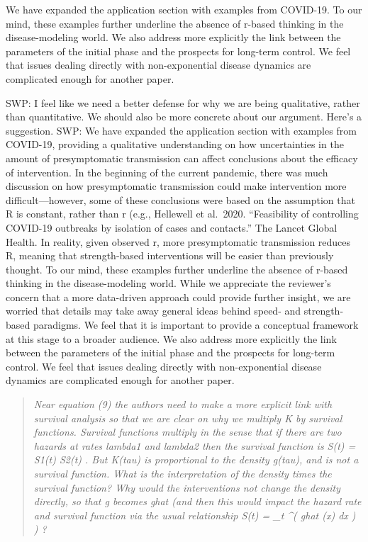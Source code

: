 We have expanded the application section with examples from COVID-19. To
our mind, these examples further underline the absence of r-based
thinking in the disease-modeling world. We also address more explicitly
the link between the parameters of the initial phase and the prospects
for long-term control. We feel that issues dealing directly with
non-exponential disease dynamics are complicated enough for another
paper.

SWP: I feel like we need a better defense for why we are being
qualitative, rather than quantitative. We should also be more concrete
about our argument. Here's a suggestion. SWP: We have expanded the
application section with examples from COVID-19, providing a qualitative
understanding on how uncertainties in the amount of presymptomatic
transmission can affect conclusions about the efficacy of intervention.
In the beginning of the current pandemic, there was much discussion on
how presymptomatic transmission could make intervention more
difficult---however, some of these conclusions were based on the
assumption that R is constant, rather than r (e.g., Hellewell et
al.~2020. ``Feasibility of controlling COVID-19 outbreaks by isolation
of cases and contacts.'' The Lancet Global Health. In reality, given
observed r, more presymptomatic transmission reduces R, meaning that
strength-based interventions will be easier than previously thought. To
our mind, these examples further underline the absence of r-based
thinking in the disease-modeling world. While we appreciate the
reviewer's concern that a more data-driven approach could provide
further insight, we are worried that details may take away general ideas
behind speed- and strength-based paradigms. We feel that it is important
to provide a conceptual framework at this stage to a broader audience.
We also address more explicitly the link between the parameters of the
initial phase and the prospects for long-term control. We feel that
issues dealing directly with non-exponential disease dynamics are
complicated enough for another paper.

\begin{quote}\sl
Near equation (9) the authors need to make a more explicit link with
survival analysis so that we are clear on why we multiply K by survival
functions. Survival functions multiply in the sense that if there are
two hazards at rates lambda1 and lambda2 then the survival function is
S(t) = S1(t) S2(t) . But K(tau) is proportional to the density g(tau),
and is not a survival function. What is the interpretation of the
density times the survival function? Why would the interventions not
change the density directly, so that g becomes ghat (and then this would
impact the hazard rate and survival function via the usual relationship
S(t) = \_t \^{}( ghat (x) dx ) ) ?
\end{quote}

